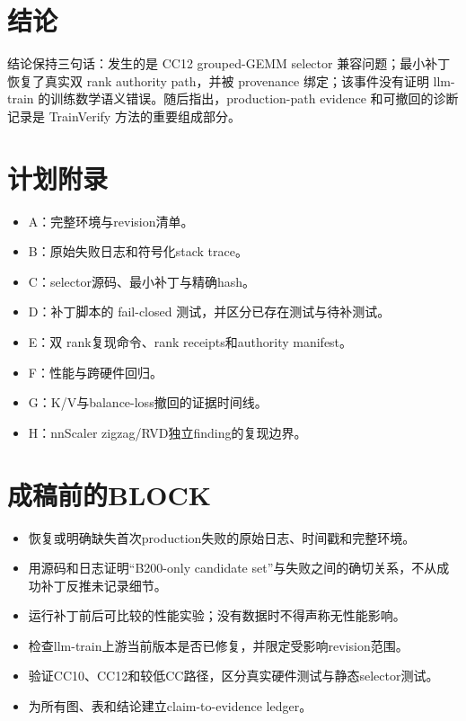 \documentclass[11pt,a4paper]{ctexart}
\begin{document}
\section{结论}
结论保持三句话：发生的是 CC12 grouped-GEMM selector 兼容问题；最小补丁恢复了真实双 rank authority path，并被 provenance 绑定；该事件没有证明 llm-train 的训练数学语义错误。随后指出，production-path evidence 和可撤回的诊断记录是 TrainVerify 方法的重要组成部分。

\appendix
\section{计划附录}
\begin{itemize}
  \item A：完整环境与revision清单。
  \item B：原始失败日志和符号化stack trace。
  \item C：selector源码、最小补丁与精确hash。
  \item D：补丁脚本的 fail-closed 测试，并区分已存在测试与待补测试。
  \item E：双 rank复现命令、rank receipts和authority manifest。
  \item F：性能与跨硬件回归。
  \item G：K/V与balance-loss撤回的证据时间线。
  \item H：nnScaler zigzag/RVD独立finding的复现边界。
\end{itemize}

\section*{成稿前的BLOCK}
\begin{itemize}
  \item 恢复或明确缺失首次production失败的原始日志、时间戳和完整环境。
  \item 用源码和日志证明“B200-only candidate set”与失败之间的确切关系，不从成功补丁反推未记录细节。
  \item 运行补丁前后可比较的性能实验；没有数据时不得声称无性能影响。
  \item 检查llm-train上游当前版本是否已修复，并限定受影响revision范围。
  \item 验证CC10、CC12和较低CC路径，区分真实硬件测试与静态selector测试。
  \item 为所有图、表和结论建立claim-to-evidence ledger。
\end{itemize}
\end{document}
